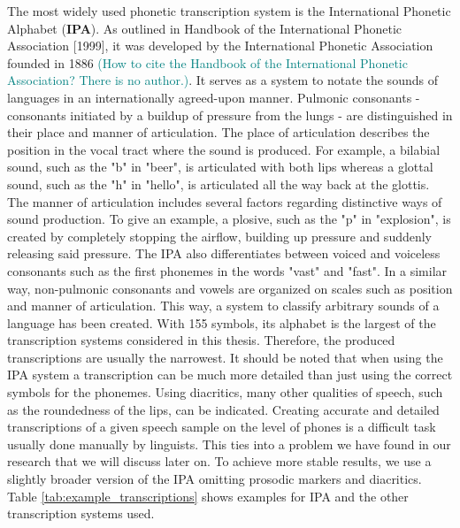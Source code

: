 The most widely used phonetic transcription system is the International Phonetic Alphabet (\textbf{IPA}). %
As outlined in Handbook of the International Phonetic Association [1999], it was developed by the International Phonetic Association founded in 1886 \textcolor{teal}{(How to cite the Handbook of the International Phonetic Association? There is no author.)}.
It serves as a system to notate the sounds of languages in an internationally agreed-upon manner.
Pulmonic consonants - consonants initiated by a buildup of pressure from the lungs - are distinguished in their place and manner of articulation.
The place of articulation describes the position in the vocal tract where the sound is produced.
For example, a bilabial sound, such as the "b" in "beer", is articulated with both lips whereas a glottal sound, such as the "h" in "hello", is articulated all the way back at the glottis.  %
The manner of articulation includes several factors regarding distinctive ways of sound production.
To give an example, a plosive, such as the "p" in "explosion", is created by completely stopping the airflow, building up pressure and suddenly releasing said pressure.
The IPA also differentiates between voiced and voiceless consonants such as the first phonemes in the words "vast" and "fast".
In a similar way, non-pulmonic consonants and vowels are organized on scales such as position and manner of articulation.
This way, a system to classify arbitrary sounds of a language has been created.
With 155 symbols, its alphabet is the largest of the transcription systems considered in this thesis.
Therefore, the produced transcriptions are usually the narrowest.
It should be noted that when using the IPA system a transcription can be much more detailed than just using the correct symbols for the phonemes.
Using diacritics, many other qualities of speech, such as the roundedness of the lips, can be indicated.
Creating accurate and detailed transcriptions of a given speech sample on the level of phones is a difficult task usually done manually by linguists.
This ties into a problem we have found in our research that we will discuss later on.
To achieve more stable results, we use a slightly broader version of the IPA omitting prosodic markers and diacritics. %
Table \ref{tab:example_transcriptions} shows examples for IPA and the other transcription systems used.
\\


